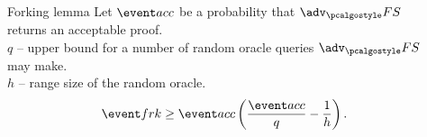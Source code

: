 \documentclass[aspectratio=169,handout]{beamer}
\newcommand{\advfs}{\adv_\fs}
\renewcommand{\myskip}{0.5\baselineskip}
\begin{document}
\begin{frame}
\begin{columns}
\begin{column}{0.5\linewidth}
\end{column}
\begin{column}{0.5\linewidth}
  \begin{block}{Forking lemma}
    Let $\accProb$ be a probability that $\advfs$ returns an acceptable proof.\\
    $q$ -- upper bound for a number of random oracle queries $\advfs$ may
    make.\\
    $h$ -- range size of the random oracle.
    \[
      \frkProb \geq \accProb \left(\frac{\accProb}{q} - \frac{1}{h}\right).
    \]
  \end{block}
\end{column}
\end{columns}
\vspace*{0.5cm}
\centering{}
\end{frame}

  
\end{document}
